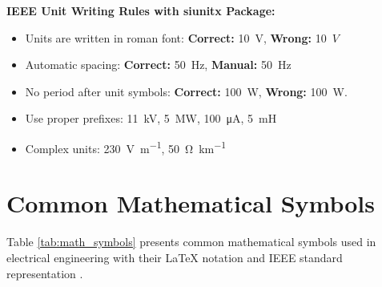 \textbf{IEEE Unit Writing Rules with siunitx Package:}
\begin{itemize}
	\item Units are written in roman font: \textbf{Correct:} \SI{10}{\volt}, \textbf{Wrong:} 10~$V$
	\item Automatic spacing: \textbf{Correct:} \SI{50}{\hertz}, \textbf{Manual:} 50~\unit{\hertz}
	\item No period after unit symbols: \textbf{Correct:} \SI{100}{\watt}, \textbf{Wrong:} 100~W.
	\item Use proper prefixes: \SI{11}{\kilo\volt}, \SI{5}{\mega\watt}, \SI{100}{\micro\ampere}, \SI{5}{\milli\henry}
	\item Complex units: \SI{230}{\volt\per\meter}, \SI{50}{\ohm\per\kilo\meter}
\end{itemize}

\section{Common Mathematical Symbols}
\label{sec:math_symbols}

Table \ref{tab:math_symbols} presents common mathematical symbols used in electrical engineering with their LaTeX notation and IEEE standard representation \cite{gratzer2016more}.

